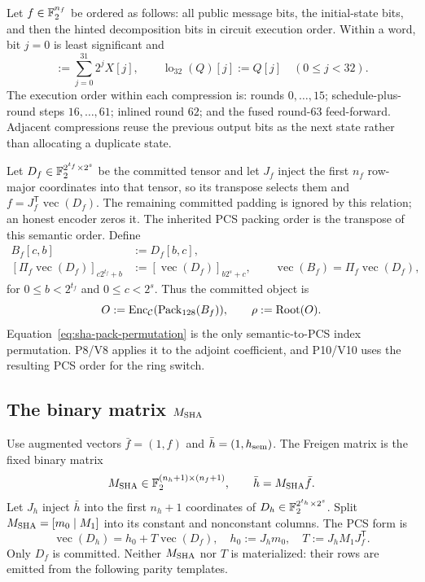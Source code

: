 Let $f\in\mathbb F_2^{n_f}$ be ordered as follows: all public message bits, the
initial-state bits, and then the hinted decomposition bits in circuit execution
order.  Within a word, bit $j=0$ is least significant and
\begin{equation}
 [X]:=\sum_{j=0}^{31}2^jX[j],\qquad
 \operatorname{lo}_{32}(Q)[j]:=Q[j]\quad(0\le j<32).
 \label{eq:sha-word-value}
\end{equation}
The execution order within each compression is: rounds $0,\ldots,15$;
schedule-plus-round steps $16,\ldots,61$; inlined round $62$; and the fused
round-$63$ feed-forward.  Adjacent compressions reuse the previous output bits
as the next state rather than allocating a duplicate state.

Let $D_f\in\mathbb F_2^{2^{t_f}\times2^s}$ be the committed tensor and let $J_f$
inject the first $n_f$ row-major coordinates into that tensor, so its transpose
selects them and
$f=J_f^{\mathsf T}\operatorname{vec}(D_f)$.  The remaining committed padding
is ignored by this relation; an honest encoder zeros it.  The inherited PCS
packing order is the transpose of this semantic order.  Define
\begin{equation}
 \begin{aligned}
 B_f[c,b]&:=D_f[b,c],\\
 [\Pi_f\operatorname{vec}(D_f)]_{c2^{t_f}+b}
   &:=[\operatorname{vec}(D_f)]_{b2^s+c},
   \qquad\operatorname{vec}(B_f)=\Pi_f\operatorname{vec}(D_f),
 \end{aligned}
 \label{eq:sha-pack-permutation}
\end{equation}
for $0\le b<2^{t_f}$ and $0\le c<2^s$.  Thus the committed object is
\begin{equation}
 O:=\operatorname{Enc}_{\mathcal C}(\operatorname{Pack}_{128}(B_f)),\qquad \rho:=\operatorname{Root}(O).
 \label{eq:sha-commitment}
\end{equation}
Equation~\eqref{eq:sha-pack-permutation} is the only semantic-to-PCS index
permutation.  P8/V8 applies it to the adjoint coefficient, and P10/V10 uses
the resulting PCS order for the ring switch.

\subsection{The binary matrix $M_{\rm SHA}$}

Use augmented vectors $\bar f=(1,f)$ and $\bar h=(1,h_{\rm sem})$.  The
Freigen matrix is the fixed binary matrix
\begin{equation}
 M_{\rm SHA}\in\mathbb F_2^{(n_h+1)\times(n_f+1)},\qquad
 \bar h=M_{\rm SHA}\bar f.
 \label{eq:sha-m-matrix}
\end{equation}
Let $J_h$ inject $\bar h$ into the first $n_h+1$ coordinates of
$D_h\in\mathbb F_2^{2^{t_h}\times2^s}$.  Split
$M_{\rm SHA}=[m_0\mid M_1]$ into its constant and nonconstant columns.  The
PCS form is
\begin{equation}
 \operatorname{vec}(D_h)=h_0+T\operatorname{vec}(D_f),\quad
 h_0:=J_hm_0,\quad T:=J_hM_1J_f^{\mathsf T}.
 \label{eq:sha-virtual-map}
\end{equation}
Only $D_f$ is committed.  Neither $M_{\rm SHA}$ nor $T$ is materialized:
their rows are emitted from the following parity templates.

